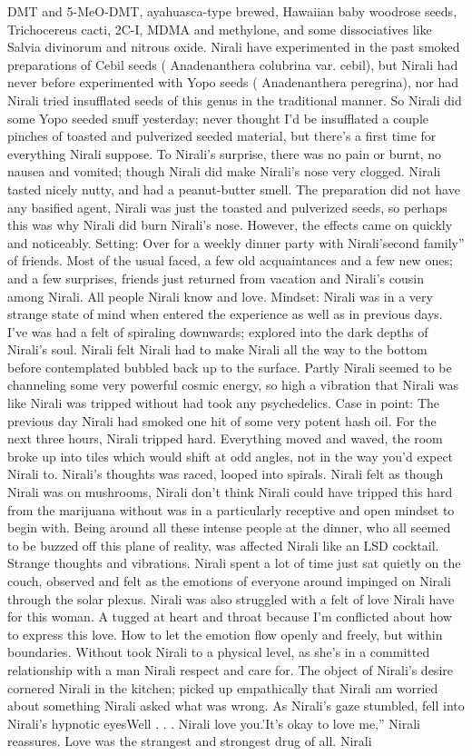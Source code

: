 \documentclass[12pt]{book}
\begin{document}
DMT and 5-MeO-DMT, ayahuasca-type brewed, Hawaiian baby woodrose seeds, Trichocereus cacti, 2C-I, MDMA and methylone, and some dissociatives like Salvia divinorum and nitrous oxide. Nirali have experimented in the past smoked preparations of Cebil seeds ( Anadenanthera colubrina var. cebil), but Nirali had never before experimented with Yopo seeds ( Anadenanthera peregrina), nor had Nirali tried insufflated seeds of this genus in the traditional manner. So Nirali did some Yopo seeded snuff yesterday; never thought I'd be insufflated a couple pinches of toasted and pulverized seeded material, but there's a first time for everything Nirali suppose. To Nirali's surprise, there was no pain or burnt, no nausea and vomited; though Nirali did make Nirali's nose very clogged. Nirali tasted nicely nutty, and had a peanut-butter smell. The preparation did not have any basified agent, Nirali was just the toasted and pulverized seeds, so perhaps this was why Nirali did burn Nirali's nose. However, the effects came on quickly and noticeably. Setting: Over for a weekly dinner party with Nirali'second family'' of friends. Most of the usual faced, a few old acquaintances and a few new ones; and a few surprises, friends just returned from vacation and Nirali's cousin among Nirali. All people Nirali know and love. Mindset: Nirali was in a very strange state of mind when entered the experience as well as in previous days. I've was had a felt of spiraling downwards; explored into the dark depths of Nirali's soul. Nirali felt Nirali had to make Nirali all the way to the bottom before contemplated bubbled back up to the surface. Partly Nirali seemed to be channeling some very powerful cosmic energy, so high a vibration that Nirali was like Nirali was tripped without had took any psychedelics. Case in point: The previous day Nirali had smoked one hit of some very potent hash oil. For the next three hours, Nirali tripped hard. Everything moved and waved, the room broke up into tiles which would shift at odd angles, not in the way you'd expect Nirali to. Nirali's thoughts was raced, looped into spirals. Nirali felt as though Nirali was on mushrooms, Nirali don't think Nirali could have tripped this hard from the marijuana without was in a particularly receptive and open mindset to begin with. Being around all these intense people at the dinner, who all seemed to be buzzed off this plane of reality, was affected Nirali like an LSD cocktail. Strange thoughts and vibrations. Nirali spent a lot of time just sat quietly on the couch, observed and felt as the emotions of everyone around impinged on Nirali through the solar plexus. Nirali was also struggled with a felt of love Nirali have for this woman. A tugged at heart and throat because I'm conflicted about how to express this love. How to let the emotion flow openly and freely, but within boundaries. Without took Nirali to a physical level, as she's in a committed relationship with a man Nirali respect and care for. The object of Nirali's desire cornered Nirali in the kitchen; picked up empathically that Nirali am worried about something Nirali asked what was wrong. As Nirali's gaze stumbled, fell into Nirali's hypnotic eyesWell . . .  Nirali love you.'It's okay to love me,'' Nirali reassures. Love was the strangest and strongest drug of all. Nirali 
\end{document}
